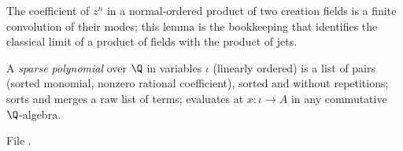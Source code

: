 \begin{physics}
The coefficient of $z^n$ in a normal-ordered product of two creation fields is a finite convolution of their modes;
this lemma is the bookkeeping that identifies the classical limit of a product of fields with the product of jets.
\end{physics}

\begin{definition}\label{l11:def:sparse}
A \emph{sparse polynomial} over $\Q$ in variables $\iota$ (linearly ordered) is a list of pairs (sorted monomial,
nonzero rational coefficient), sorted and without repetitions;  sorts and merges a raw list of
terms;  evaluates at $x:\iota\to A$ in any commutative $\Q$-algebra.
\end{definition}
\noindent File .

